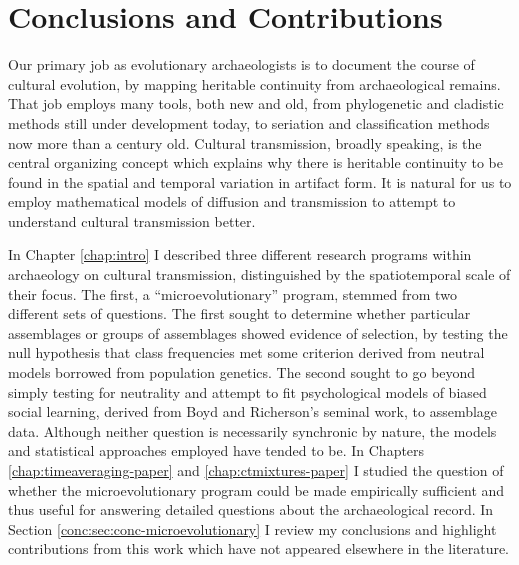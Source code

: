 \section{Conclusions and Contributions}\label{conc:sec:research-conclusions}

Our primary job as evolutionary archaeologists is to document the course of cultural evolution, by mapping heritable continuity from archaeological remains.  That job employs many tools, both new and old, from phylogenetic and cladistic methods still under development today, to seriation and classification methods now more than a century old.  Cultural transmission, broadly speaking, is the central organizing concept which explains why there is heritable continuity to be found in the spatial and temporal variation in artifact form.  It is natural for us to employ mathematical models of diffusion and transmission to attempt to understand cultural transmission better.  

In Chapter \ref{chap:intro} I described three different research programs within archaeology on cultural transmission, distinguished by the spatiotemporal scale of their focus.  The first, a ``microevolutionary'' program, stemmed from two different sets of questions.  The first sought to determine whether particular assemblages or groups of assemblages showed evidence of selection, by testing the null hypothesis that class frequencies met some criterion derived from neutral models borrowed from population genetics.  The second sought to go beyond simply testing for neutrality and attempt to fit psychological models of biased social learning, derived from Boyd and Richerson's seminal work, to assemblage data.  Although neither question is necessarily synchronic by nature, the models and statistical approaches employed have tended to be.  In Chapters \ref{chap:timeaveraging-paper} and \ref{chap:ctmixtures-paper} I studied the question of whether the microevolutionary program could be made empirically sufficient and thus useful for answering detailed questions about the archaeological record.  In Section \ref{conc:sec:conc-microevolutionary} I review my conclusions and highlight contributions from this work which have not appeared elsewhere in the literature.

